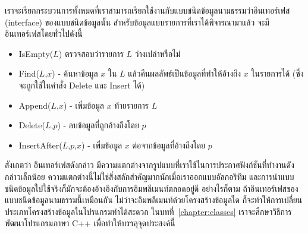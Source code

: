 เรา{\wbr}จะ{\wbr}เรียก{\wbr}กระบวนการ{\wbr}ทั้งหมด{\wbr}ที่{\wbr}เรา{\wbr}สามารถ{\wbr}เรียก{\wbr}ใช้{\wbr}งาน{\wbr}กับ{\wbr}แบบ{\wbr}ชนิด{\wbr}ข้อมูล{\wbr}นามธรรม{\wbr}ว่า{\wbr}อิน{\wbr}เทอร์เฟส
(interface) ของ{\wbr}แบบ{\wbr}ชนิด{\wbr}ข้อมูล{\wbr}นั้น สำหรับ{\wbr}ข้อมูล{\wbr}แบบ{\wbr}รายการ{\wbr}ที่{\wbr}เรา{\wbr}ได้{\wbr}พิจารณา{\wbr}มา{\wbr}แล้ว{\wbr}
จะ{\wbr}มี{\wbr}อิน{\wbr}เทอร์เฟส{\wbr}โดย{\wbr}ทั่วไป{\wbr}ดังนี้{\wbr}

\begin{itemize}
\item IsEmpty($L$) ตรวจสอบ{\wbr}ว่า{\wbr}รายการ $L$ ว่างเปล่า{\wbr}หรือ{\wbr}ไม่{\wbr}
\item Find($L$,$x$) - ค้นหา{\wbr}ข้อมูล $x$ ใน $L$ แล้ว{\wbr}คืน{\wbr}ผลลัพธ์{\wbr}เป็น{\wbr}ข้อมูล{\wbr}ที่{\wbr}ทำ{\wbr}ให้{\wbr}อ้าง{\wbr}ถึง{\wbr}
  $x$ ใน{\wbr}รายการ{\wbr}ได้ (ซึ่ง{\wbr}จะ{\wbr}ถูก{\wbr}ใช้{\wbr}ใน{\wbr}คำสั่ง Delete และ Insert ได้)
\item Append($L$,$x$) - เพิ่ม{\wbr}ข้อมูล $x$ ท้าย{\wbr}รายการ $L$
\item Delete($L$,$p$) - ลบ{\wbr}ข้อมูล{\wbr}ที่{\wbr}ถูก{\wbr}อ้าง{\wbr}ถึง{\wbr}โดย $p$
\item InsertAfter($L$,$p$,$x$) - เพิ่ม{\wbr}ข้อมูล $x$ ต่อ{\wbr}จาก{\wbr}ข้อมูล{\wbr}ที่{\wbr}อ้าง{\wbr}ถึง{\wbr}โดย $p$
\end{itemize}

สังเกต{\wbr}ว่า อิน{\wbr}เทอร์เฟส{\wbr}ดังกล่าว{\wbr}
มี{\wbr}ความ{\wbr}แตกต่าง{\wbr}จาก{\wbr}รูปแบบ{\wbr}ที่{\wbr}เรา{\wbr}ใช้{\wbr}ใน{\wbr}การ{\wbr}ประกาศ{\wbr}ฟังก์ชัน{\wbr}ที่ทำงาน{\wbr}ดังกล่าว{\wbr}เล็กน้อย{\wbr}
ความ{\wbr}แตกต่าง{\wbr}นี้{\wbr}ไม่{\wbr}ใช่{\wbr}สิ่ง{\wbr}สลักสำคัญ{\wbr}มาก{\wbr}นัก{\wbr}เมื่อ{\wbr}เรา{\wbr}ออกแบบ{\wbr}อัล{\wbr}กอ{\wbr}ริ{\wbr}ทึม{\wbr}
และ{\wbr}การ{\wbr}นำ{\wbr}แบบ{\wbr}ชนิด{\wbr}ข้อมูล{\wbr}ใป{\wbr}ใช้{\wbr}จริง{\wbr}ก็{\wbr}มักจะ{\wbr}ต้อง{\wbr}อ้างอิง{\wbr}กับ{\wbr}การ{\wbr}อิม{\wbr}พลี{\wbr}เมนท์{\wbr}ตลอด{\wbr}อยู่{\wbr}ดี อย่างไรก็ตาม{\wbr}
ถ้า{\wbr}อิน{\wbr}เทอร์เฟส{\wbr}ของ{\wbr}แบบ{\wbr}ชนิด{\wbr}ข้อมูล{\wbr}นามธรรม{\wbr}นี้{\wbr}เหมือน{\wbr}กัน{\wbr}
ไม่ว่า{\wbr}จะ{\wbr}อิม{\wbr}พลี{\wbr}เมนท์{\wbr}ด้วย{\wbr}โครงสร้าง{\wbr}ข้อมูล{\wbr}ใด{\wbr}
ก็{\wbr}จะ{\wbr}ทำ{\wbr}ให้การ{\wbr}เปลี่ยน{\wbr}ประเภท{\wbr}โครงสร้าง{\wbr}ข้อมูล{\wbr}ใน{\wbr}โปรแกรม{\wbr}ทำ{\wbr}ได้{\wbr}สะดวก{\wbr}
ใน{\wbr}บท{\wbr}ที่~\ref{chapter:classes} เรา{\wbr}จะ{\wbr}ศึกษา{\wbr}วิธีการ{\wbr}พัฒนา{\wbr}โปรแกรม{\wbr}ภาษา C++
เพื่อ{\wbr}ทำ{\wbr}ให้{\wbr}บรรลุ{\wbr}จุดประสงค์{\wbr}นี้{\wbr}

